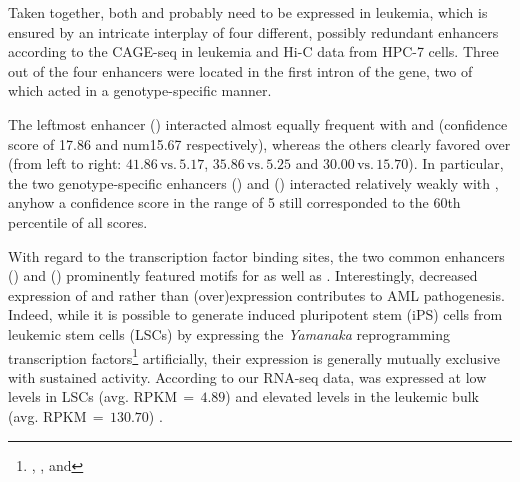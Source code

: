 Taken together, both  and  probably need to be expressed in \mllafnine leukemia, which is ensured by an intricate interplay of four different, possibly redundant enhancers according to the CAGE-seq in \mllafnine leukemia and Hi-C data from HPC-7 cells. Three out of the four enhancers were located in the first intron of the  gene, two of which acted in a genotype-specific manner.  

The leftmost enhancer () interacted almost equally frequent with  and  (confidence score of \num{17.86} and num{15.67} respectively), whereas the others clearly favored  over  (from left to right: $41.86 \,\text{vs.}\,5.17$, $35.86 \,\text{vs.}\,5.25$ and $30.00 \,\text{vs.}\,15.70$). In particular, the two genotype-specific enhancers () and () interacted relatively weakly with , anyhow a confidence score in the range of \num{5} still corresponded to the \num{60}th percentile of all scores.  

With regard to the transcription factor binding sites, the two common enhancers () and 
() prominently featured motifs for  as well as . Interestingly, decreased expression of \cite{Rosenbauer2004,Rosenbauer2006} and \cite{Morris2016}  rather than (over)expression contributes to AML pathogenesis. Indeed, while it is possible to generate induced pluripotent stem (iPS) cells\cite{Takahashi2006} from \mllafnine leukemic stem cells (LSCs) by expressing the \emph{Yamanaka} reprogramming transcription factors\footnote{, ,  and } artificially, their expression is generally mutually exclusive with sustained \mllafnine activity\cite{Liu2014}. According to our RNA-seq data,  was expressed at low levels in LSCs (avg. RPKM$\,=\,4.89$) and elevated levels in the leukemic bulk (avg. RPKM$\,=\,130.70$) .

